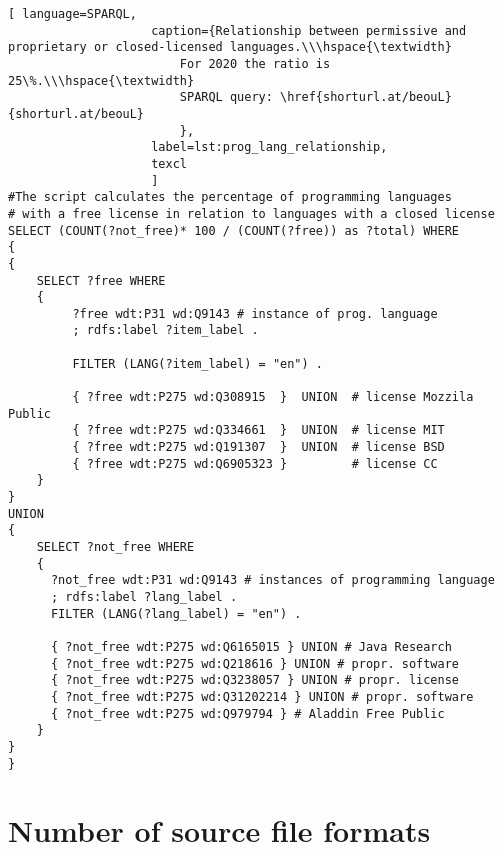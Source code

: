 \begin{lstlisting}[ language=SPARQL, 
                    caption={Relationship between permissive and proprietary or closed-licensed languages.\\\hspace{\textwidth}
                        For 2020 the ratio is 25\%.\\\hspace{\textwidth}
                        SPARQL query: \href{shorturl.at/beouL}{shorturl.at/beouL}
                        },
                    label=lst:prog_lang_relationship,
                    texcl 
                    ]
#The script calculates the percentage of programming languages 
# with a free license in relation to languages with a closed license
SELECT (COUNT(?not_free)* 100 / (COUNT(?free)) as ?total) WHERE
{ 
{
    SELECT ?free WHERE 
    {
         ?free wdt:P31 wd:Q9143 # instance of prog. language
         ; rdfs:label ?item_label . 

         FILTER (LANG(?item_label) = "en") . 
  
         { ?free wdt:P275 wd:Q308915  }  UNION  # license Mozzila Public
         { ?free wdt:P275 wd:Q334661  }  UNION  # license MIT
         { ?free wdt:P275 wd:Q191307  }  UNION  # license BSD
         { ?free wdt:P275 wd:Q6905323 }         # license CC
    }
}
UNION
{
    SELECT ?not_free WHERE 
    {
      ?not_free wdt:P31 wd:Q9143 # instances of programming language
      ; rdfs:label ?lang_label . 
      FILTER (LANG(?lang_label) = "en") .
  
      { ?not_free wdt:P275 wd:Q6165015 } UNION # Java Research
      { ?not_free wdt:P275 wd:Q218616 } UNION # propr. software
      { ?not_free wdt:P275 wd:Q3238057 } UNION # propr. license 
      { ?not_free wdt:P275 wd:Q31202214 } UNION # propr. software 
      { ?not_free wdt:P275 wd:Q979794 } # Aladdin Free Public
    }
}
}
\end{lstlisting}%

\section{Number of source file formats}

